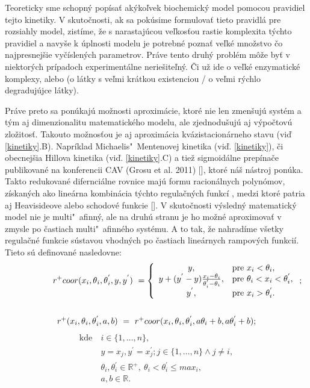 \documentclass[11pt,final,oneside]{fithesis}
\begin{document}
Teoreticky sme schopn\'y  pop\'isa\v t ak\' yko\v lvek biochemick\'y model pomocou pravidiel tejto kinetiky. V skuto\v cnosti, ak sa pok\'usime formulova\v t 
tieto pravidl\'a pre rozsiahly model, zist\'ime, \v ze s narastaj\'ucou ve\v lkos\v tou rastie komplexita t\'ychto pravidiel a navy\v se k \'uplnosti modelu
je potrebn\'e pozna\v t ve\v lk\'e mno\v zstvo \v co najpresnej\v sie vy\v c\'islen\'ych parametrov. Pr\'ave tento druh\'y probl\'em m\^ o\v ze by\v t 
v niektor\'ych pr\'ipadoch experiment\'alne nerie\v site\v ln\'y. \v Ci u\v z ide o ve\v lk\'e enzymatick\'e komplexy, alebo (o l\'atky s ve\v lmi 
kr\'atkou existenciou / o ve\v lmi r\'ychlo degraduj\'ujce l\'atky).

Pr\'ave preto sa pon\'ukaj\'u mo\v znosti aproxim\'acie, ktor\'e nie len zmen\v suj\'u syst\'em a t\'ym aj dimenzionalitu matematick\'eho modelu, 
ale zjednodu\v suj\'u aj v\'ypo\v ctov\'u zlo\v zitos\v t. Takouto mo\v znos\v tou je aj aproxim\'acia kv\'azistacion\'arneho stavu (vi\v d \ref{kinetiky}.B). 
Napr\'iklad Michaelis"~Mentenovej kinetika (vi\v d. \ref{kinetiky}), 
\v ci obecnej\v sia Hillova kinetika (vi\v d. \ref{kinetiky}.C) a tie\v z sigmoid\'alne prep\'ina\v ce publikovan\'e na konferencii CAV (Grosu et al. 2011) [], 
ktor\'e n\'a\v s n\'astroj pon\'uka. Takto redukovan\' e difernci\'alne rovnice maj\'u formu 
racion\'alnych polyn\'omov, z\'iskan\'ych ako line\'arna kombin\'acia t\'ychto regula\v cn\'ych funkc\'i%
, medzi ktor\'e patria aj Heavisideove alebo schodov\'e funkcie []. 
V skuto\v cnosti v\'ysledn\'y 
matematick\'y model nie je multi"~afinn\'y, ale na druh\'u stranu je ho mo\v zn\'e aproximova\v t v zmysle po \v castiach mul\-ti"~afin\-n\'eho syst\'emu. 
A to tak, \v ze nahrad\'ime v\v setky regula\v cn\'e funkcie s\'ustavou vhodn\'ych po \v castiach line\'arnych rampov\'ych funkci\'i. Tieto s\'u definovan\'e 
nasledovne:
\begin{align*}
	r^+coor (x_i,\theta{}_i,\theta{}_i^{'},y,y^{'}) \ = \left\{ \begin{array}{cl}
y, & \textrm{pre} \ x_i < \theta_i,\\
y + (y^{'} - y)\frac{x_i - \theta_i}{\theta_i^{'} - \theta_i}, & \textrm{pre} \ \theta_i < x_i < \theta_i^{'},\\
y^{'}, & \textrm{pre} \ x_i > \theta_i^{'}.
	\end{array}
	\right.;
	\\
	\\
	\centerline{$r^+ (x_i, \theta{}_i, \theta{}_i^{'}, a,b) \ = \ r^+coor (x_i,\theta{}_i,\theta{}_i^{'},a\theta_i + b,a\*\theta_i^{'} + b)$;}
\end{align*}
\begin{align*}
	\textrm{kde} \ &i \in \{1,\dots{},n\},\\
	&y = x_j, y^{'} = x_j^{'}; j \in \{1,\dots{},n\} \wedge j \neq i,\\
	&\theta_i, \theta_i^{'} \in \mathbb{R}^+, \ \theta_i < \theta_i^{'} \leq max_i,\\
	&a, b \in \mathbb{R}.
\end{align*}
\end{document}
